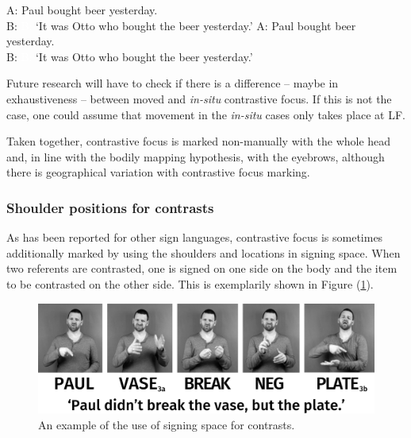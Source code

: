 \begin{exe}
\ex\label{ex:contrastivefocusa}\begin{xlist}
\ex
A: Paul bought beer yesterday. \\
B:   
%
\glt \textcolor{white}{B: }`It was Otto who bought the beer yesterday.' \label{ex:contrastivefocusaa}
\newpage
\ex
A: Paul bought beer yesterday. \\
B:  
%
\glt \textcolor{white}{B: }`It was Otto who bought the beer yesterday.' \label{ex:contrastivefocusab}


\end{xlist}
\end{exe}

\noindent Future research will have to check if there is a difference -- maybe in exhaustiveness -- between moved and \textit{in-situ} contrastive focus. If this is not the case, one could assume that movement in the \textit{in-situ} cases only takes place at LF.

Taken together, contrastive focus is marked non-manually with the whole head and, in line with the bodily mapping hypothesis, with the eyebrows, although there is geographical variation with contrastive focus marking.

\subsubsection{Shoulder positions for contrasts}
As has been reported for other sign languages, contrastive focus is sometimes additionally marked by using the shoulders and locations in signing space. When two referents are contrasted, one is signed on one side on the body and the item to be contrasted on the other side. This is exemplarily shown in Figure (\ref{contrastiveshoulders}).


\begin{figure}[bt]
\centering
	\includegraphics[width=1.0\textwidth]{contrastiveshoulderssw.jpg}
	\caption{An example of the use of signing space for contrasts.}
	\label{contrastiveshoulders}
\end{figure}

